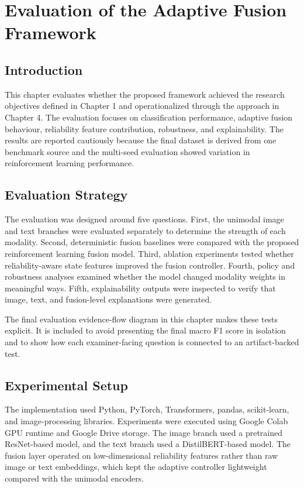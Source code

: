 \chapter{Evaluation of the Adaptive Fusion Framework}


\section{Introduction}


This chapter evaluates whether the proposed framework achieved the research objectives defined in Chapter 1 and operationalized through the approach in Chapter 4. The evaluation focuses on classification performance, adaptive fusion behaviour, reliability feature contribution, robustness, and explainability. The results are reported cautiously because the final dataset is derived from one benchmark source and the multi-seed evaluation showed variation in reinforcement learning performance.


\section{Evaluation Strategy}


The evaluation was designed around five questions. First, the unimodal image and text branches were evaluated separately to determine the strength of each modality. Second, deterministic fusion baselines were compared with the proposed reinforcement learning fusion model. Third, ablation experiments tested whether reliability-aware state features improved the fusion controller. Fourth, policy and robustness analyses examined whether the model changed modality weights in meaningful ways. Fifth, explainability outputs were inspected to verify that image, text, and fusion-level explanations were generated.


The final evaluation evidence-flow diagram in this chapter makes these tests explicit. It is included to avoid presenting the final macro F1 score in isolation and to show how each examiner-facing question is connected to an artifact-backed test.


\section{Experimental Setup}


The implementation used Python, PyTorch, Transformers, pandas, scikit-learn, and image-processing libraries. Experiments were executed using Google Colab GPU runtime and Google Drive storage. The image branch used a pretrained ResNet-based model, and the text branch used a DistilBERT-based model. The fusion layer operated on low-dimensional reliability features rather than raw image or text embeddings, which kept the adaptive controller lightweight compared with the unimodal encoders.


